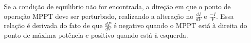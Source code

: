 \noindent
\begin{minipage}{\linewidth}
\label{CI_flux_fig}
\end{minipage}

Se a condição de equilibrio não for encontrada, a direção em que o ponto de operação MPPT deve ser perturbado, realizando a alteração no $\frac{dI}{dV}$ e $\frac{-I}{V}$. Essa relação é derivada do fato de que $\frac{dP}{dV}$ é negativo quando o MPPT está à direita do ponto de máxima potência e positivo quando está à esquerda.

